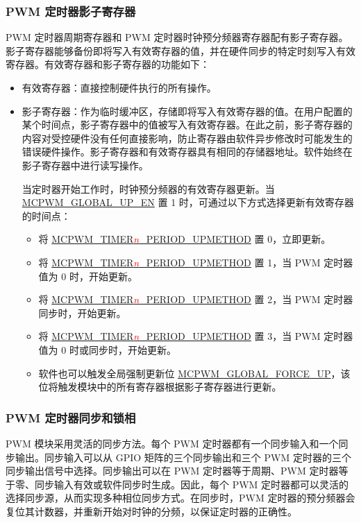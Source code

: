 \documentclass[main\_\_CN.tex]{subfiles}
\begin{document}
\subsubsection{PWM 定时器影子寄存器}
\label{sec:mcpwm-shdw_reg}

PWM 定时器周期寄存器和 PWM 定时器时钟预分频器寄存器配有影子寄存器。影子寄存器能够备份即将写入有效寄存器的值，并在硬件同步的特定时刻写入有效寄存器。有效寄存器和影子寄存器的功能如下：
\begin{itemize}
    \item 有效寄存器：直接控制硬件执行的所有操作。
    \item 影子寄存器：作为临时缓冲区，存储即将写入有效寄存器的值。在用户配置的某个时间点，影子寄存器中的值被写入有效寄存器。在此之前，影子寄存器的内容对受控硬件没有任何直接影响，防止寄存器由软件异步修改时可能发生的错误硬件操作。影子寄存器和有效寄存器具有相同的存储器地址。软件始终在影子寄存器中进行读写操作。

    当定时器开始工作时，时钟预分频器的有效寄存器更新。当 \hyperref[fielddesc:MCPWMGLOBALUPEN]{MCPWM\_GLOBAL\_UP\_EN} 置 1 时，可通过以下方式选择更新有效寄存器的时间点：
    \begin{itemize}
        \item 将 \hyperref[fielddesc:MCPWMTIMERNPERIODUPMETHOD]{MCPWM\_TIMER\textcolor{red}{\it{n}}\_PERIOD\_UPMETHOD} 置 0，立即更新。
        \item 将 \hyperref[fielddesc:MCPWMTIMERNPERIODUPMETHOD]{MCPWM\_TIMER\textcolor{red}{\it{n}}\_PERIOD\_UPMETHOD} 置 1，当 PWM 定时器值为 0 时，开始更新。
        \item 将 \hyperref[fielddesc:MCPWMTIMERNPERIODUPMETHOD]{MCPWM\_TIMER\textcolor{red}{\it{n}}\_PERIOD\_UPMETHOD} 置 2，当 PWM 定时器同步时，开始更新。
        \item 将 \hyperref[fielddesc:MCPWMTIMERNPERIODUPMETHOD]{MCPWM\_TIMER\textcolor{red}{\it{n}}\_PERIOD\_UPMETHOD} 置 3，当 PWM 定时器值为 0 时或同步时，开始更新。
        \item 软件也可以触发全局强制更新位 \hyperref[fielddesc:MCPWMGLOBALFORCEUP]{MCPWM\_GLOBAL\_FORCE\_UP}，该位将触发模块中的所有寄存器根据影子寄存器进行更新。
    \end{itemize}
\end{itemize}

\subsubsection{PWM 定时器同步和锁相}
PWM 模块采用灵活的同步方法。每个 PWM 定时器都有一个同步输入和一个同步输出。同步输入可以从 GPIO 矩阵的三个同步输出和三个 PWM 定时器的三个同步输出信号中选择。同步输出可以在 PWM 定时器等于周期、PWM 定时器等于零、同步输入有效或软件同步时生成。因此，每个 PWM 定时器都可以灵活的选择同步源，从而实现多种相位同步方式。在同步时，PWM 定时器的预分频器会复位其计数器，并重新开始对时钟的分频，以保证定时器的正确性。
\end{document}

